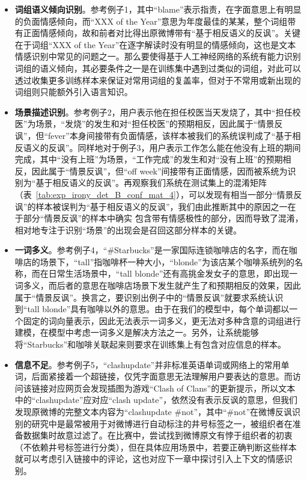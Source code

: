 \begin{itemize}

\item {\bf 词组语义倾向识别}。参考例子1，其中“blame”表示指责，在字面意思上有明显的负面情感倾向，而“XXX of the Year”意思为年度最佳的某某，整个词组带有正面情感倾向，故和前者对比得出原微博带有“基于相反语义的反讽”。关键在于词组“XXX of the Year”在逐字解读时没有明显的情感倾向，这也是文本情感识别中常见的问题之一。那么要使得基于人工神经网络的系统有能力识别词组的语义倾向，其必要条件之一是在训练集中遇到过类似的词组，对此可以透过收集更多训练样本来保证对常用词组的复盖率，但对于不常用或新出现的词组则只能额外引入语言知识。

\item {\bf 场景描述识别}。参考例子2，用户表示他在担任校医当天发烧了，其中“担任校医”为场景，“发烧”的发生和对“担任校医”的预期相反，因此属于“情景反讽”，但“fever”本身间接带有负面情感，该样本被我们的系统误判成了“基于相反语义的反讽”。同样地对于例子3，用户表示工作怎么能在他没有上班的期间完成，其中“没有上班”为场景，“工作完成”的发生和对“没有上班”的预期相反，因此属于“情景反讽”，但“off week”间接带有正面情感，因而被系统为识别为“基于相反语义的反讽”。再观察我们系统在测试集上的混淆矩阵（表~\ref{tab:exp_irony_det_B_conf_mat_4}），可以发现有相当一部分“情景反讽”的样本被误判为“基于相反语义的反讽”，我们由此推断其中的原因之一在于部分“情景反讽”的样本中确实
包含带有情感极性的部分，因而导致了混淆，相对地专注于识别“场景”的出现会是召回这部分样本的关键。

\item {\bf 一词多义}。参考例子4，“\#Starbucks”是一家国际连锁咖啡店的名字，而在咖啡店的场景下，“tall”指咖啡杯一种大小，“blonde”为该店某个咖啡系统列的名称，而在日常生活场景中，“tall blonde”还有高挑金发女子的意思，即出现一词多义，而后者的意思在咖啡店场景下发生就产生了和预期相反的效果，因此属于“情景反讽”。换言之，要识别出例子中的“情景反讽”就要求系统认识到“tall blonde”具有咖啡以外的意思。由于在我们的模型中，每个单词都以一个固定的词向量表示，因此无法表示一词多义，更无法对多种含意的词组进行建模，在模型中考虑一词多义是解决方法之一。另外，让系统能够将“Starbucks”和咖啡关联起来则要求在训练集上有包含对应信息的样本。

\item {\bf 信息不足}。参考例子5，“clashupdate”并非标准英语单词或网络上的常用单词，后面紧接着一个超链接，仅凭字面意思无法理解用户要表达的意思。而访问该链接对应网页会发现插图为游戏“Clash of Clans”的更新提示，所以文本中的“clashupdate”应对应“clash update”，依然没有表示反讽的意思，但我们发现原微博的完整文本内容为“clashupdate \#not”，其中“\#not”在微博反讽识别的研究中是最常被用于对微博进行自动标注的井号标签之一，被组织者在准备数据集时故意过滤了。在比赛中，尝试找到微博原文有悖于组织者的初衷（不依赖井号标签进行分类），但在具体应用场景中，若要正确判断这些样本就可以考虑引入链接中的评论，这也对应下一章中探讨引入上下文的情感识别。

\end{itemize}

